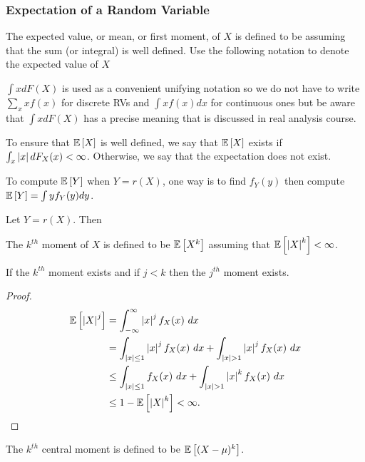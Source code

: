 \subsubsection{Expectation of a Random Variable}

\begin{defn}
    The expected value, or mean, or first moment, of $X$ is defined to be
    assuming that the sum (or integral) is well defined. Use the following notation to denote the expected value of $X$
\end{defn}
$\int x dF(X)$ is used as a convenient unifying notation so we do not have to write $\sum_{x} xf(x)$ for discrete RVs and $\int xf(x) dx$ for continuous ones but be aware that $\int x dF(X)$ has a precise meaning that is discussed in real analysis course.

To ensure that $\mathbb{E}\left[X\right]$ is well defined, we say that $\mathbb{E}\left[X\right]$ exists if $\int_{x} \left| x \right| dF_{X}(x) < \infty$. Otherwise, we say that the expectation does not exist.

To compute $\mathbb{E}\left[Y\right]$ when $Y = r(X)$, one way is to find $f_Y(y)$ then compute $\mathbb{E}\left[Y\right] = \int yf_{Y}(y) dy$.
\begin{thm}
    Let $Y = r(X)$. Then
\end{thm}
The $k^{th}$ moment of $X$ is defined to be $\mathbb{E}\left[X^k\right]$ assuming that $\mathbb{E}\left[\left| X \right|^k\right] < \infty$.
\begin{thm}
    If the $k^{th}$ moment exists and if $j < k$ then the $j^{th}$ moment exists.
\end{thm}
\begin{proof}
    \begin{align*}
        \E{\abs{X}^j} &= \int^{\infty}_{-\infty} \abs{x}^j f_{X}(x)\ dx \\
        &= \int_{\abs{x} \leq 1} \abs{x}^j f_{X}(x)\ dx + \int_{\abs{x} > 1} \abs{x}^j f_{X}(x)\ dx \\
        &\leq \int_{\abs{x} \leq 1} f_{X}(x)\ dx + \int_{\abs{x} > 1} \abs{x}^k f_{X}(x)\ dx \\
        &\leq 1 - \E{\abs{X}^k} < \infty.
    \end{align*}
\end{proof}
The $k^{th}$ central moment is defined to be $\mathbb{E}\left[(X - \mu)^k\right]$.

